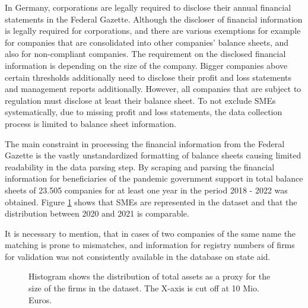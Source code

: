 In Germany, corporations are legally required to disclose their annual financial statements in the Federal Gazette. Although the discloser of financial information is legally required for corporations, and there are various exemptions for example for companies that are consolidated into other companies' balance sheets, and also for non-compliant companies.
The requirement on the disclosed financial information is depending on the size of the company. Bigger companies above certain thresholds additionally need to disclose their profit and loss statements and management reports additionally. However, all companies that are subject to regulation must disclose at least their balance sheet. 
To not exclude SMEs systematically, due to missing profit and loss statements, the data collection process is limited to balance sheet information. 

The main constraint in processing the financial information from the Federal Gazette is the vastly unstandardized formatting of balance sheets causing limited readability in the data parsing step. By scraping and parsing the financial information for beneficiaries of the pandemic government support in total balance sheets of 23.505 companies for at least one year in the period 2018 - 2022 was obtained. Figure \ref{fig:FirmSizes} shows that SMEs are represented in the dataset and that the distribution between 2020 and 2021 is comparable.

It is necessary to mention, that in cases of two companies of the same name the matching is prone to mismatches, and information for registry numbers of firms for validation was not consistently available in the database on state aid.

\begin{figure}
    \centering
    
    \decoRule
    \caption[Firm size distribution in dataset]{Histogram shows the distribution of total assets as a proxy for the size of the firms in the dataset. The X-axis is cut off at 10 Mio. Euros.}
    \label{fig:FirmSizes}
\end{figure}


